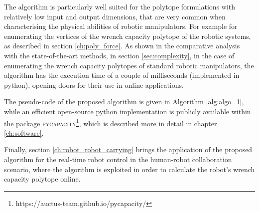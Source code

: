 The algorithm is particularly well suited for the polytope formulations with relatively low input and output dimensions, that are very common when characterising the physical abilities of robotic manipulators. For example for enumerating the vertices of the wrench capacity polytope of the robotic systems, as described in section \ref{ch:poly_force}. As shown in the comparative analysis with the state-of-the-art methods, in section \ref{sec:complexity},  in the case of enumerating the wrench capacity polytopes of standard robotic manipulators, the algorithm has the execution time of a couple of milliseconds (implemented in python), opening doors for their use in online applications.

The pseudo-code of the proposed algorithm is given in Algorithm \ref{alg:algo_1}, while an efficient open-source python implementation is publicly available within the package \textsc{pycapacity}\footnote{https://auctus-team.github.io/pycapacity/}, which is described more in detail in chapter \ref{ch:software}.

Finally, section \ref{ch:robot_robot_carrying} brings the application of the proposed algorithm for the real-time robot control in the human-robot collaboration scenario, where the algorithm is exploited in order to calculate the robot's wrench capacity polytope online. 


